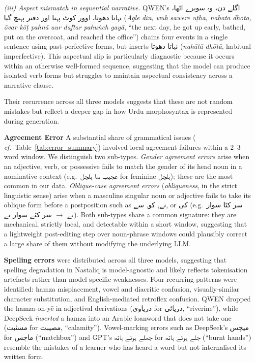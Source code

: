 \documentclass[11pt]{article}
\begin{document}
\textit{(iii) Aspect mismatch in sequential narrative.}
QWEN's
\foreignlanguage{arabic}{اگلے دن، وہ سویرے اٹھا، نہاتا دھوتا، اوور کوٹ پہنا اور دفتر پہنچ گیا}
(\textit{Aglē din, wuh sawērē uṭhā, nahātā dhōtā, ōvar
kōṭ pahnā aur daftar pahuṅch gayā}, ``the next day, he
got up early, bathed, put on the overcoat, and reached
the office'') chains four events in a single sentence
using past-perfective forms, but inserts
\foreignlanguage{arabic}{نہاتا دھوتا} (\textit{nahātā
dhōtā}, habitual imperfective). This aspectual slip is particularly
diagnostic because it occurs within an otherwise
well-formed sequence, suggesting that the model can
produce isolated verb forms but struggles to maintain
aspectual consistency across a narrative clause.

Their recurrence
across all three models suggests that these are not
random mistakes but reflect a deeper gap in how Urdu
morphosyntax is represented during generation.


\textbf{Agreement Error} A substantial share of grammatical issues
( \textit{cf.}\
Table~\ref{tab:error_summary}) involved local
agreement failures within a 2--3 word window. We
distinguish two sub-types. \textit{Gender agreement
errors} arise when an adjective, verb, or possessive
fails to match the gender of its head noun in a
nominative context (e.g.\
\foreignlanguage{arabic}{عجیب سا ہلچل} for feminine
\foreignlanguage{arabic}{ہلچل}); these are the most
common in our data. \textit{Oblique-case agreement
errors} (\emph{obliqueness}, in the strict
linguistic sense) arise when a masculine singular
noun or adjective fails to take its oblique form
before a postposition such as
\foreignlanguage{arabic}{نے},
\foreignlanguage{arabic}{کو},
\foreignlanguage{arabic}{سے}, or
\foreignlanguage{arabic}{کی}
(e.g.\ \foreignlanguage{arabic}{سر کٹا سوار نے}
$\rightarrow$ \foreignlanguage{arabic}{سر کٹے سوار نے}).
Both sub-types share a common signature: they are
mechanical, strictly local, and detectable within a
short window, suggesting that a lightweight
post-editing step over noun-phrase windows could
plausibly correct a large share of them without
modifying the underlying LLM.

\textbf{Spelling errors} were distributed across all
three models, suggesting that spelling degradation in
Nastaliq is model-agnostic and likely reflects
tokenisation artefacts rather than model-specific
weaknesses. Four recurring patterns were identified:
hamza misplacement, vowel and diacritic confusion,
visually-similar character substitution, and
English-mediated retroflex confusion. QWEN dropped the
hamza-on-yē in adjectival derivations
(\foreignlanguage{arabic}{دریاوی} for
\foreignlanguage{arabic}{دریائی}, ``riverine''), while
DeepSeek \emph{inserted} a hamza into an Arabic loanword
that does not take one
(\foreignlanguage{arabic}{مسئبت} for
\foreignlanguage{arabic}{مصیبت}, ``calamity''). Vowel-marking errors such as DeepSeek's
\foreignlanguage{arabic}{میچس} for
\foreignlanguage{arabic}{ماچس} (``matchbox'') and GPT's
\foreignlanguage{arabic}{جھلے ہوئے ہاتھ} for
\foreignlanguage{arabic}{جلے ہوئے ہاتھ} (``burnt
hands'')
resemble the mistakes of a learner who has heard a word
but not internalised its written form.
\end{document}
